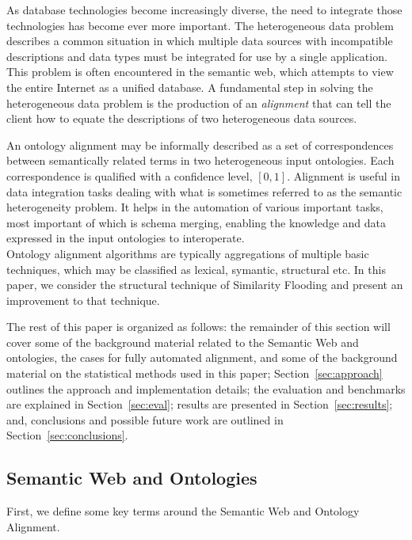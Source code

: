 \documentclass[letterpaper,twocolumn,12pt]{article}
\begin{document}
As database technologies become increasingly diverse, the need to integrate those
technologies has become ever more important. The heterogeneous data problem
describes a common situation in which multiple data sources
with incompatible descriptions and data types must be integrated
for use by a single application. This problem is often encountered in 
the semantic web, which attempts to view the entire Internet as a unified database. 
A fundamental step in solving the heterogeneous data problem
is the production of an \textit{alignment} that can tell the client how to equate
the descriptions of two heterogeneous data sources.

An ontology alignment may be informally described as a set of correspondences 
between semantically related terms in two heterogeneous input ontologies. 
Each correspondence is qualified with a confidence level, $[0,1]$.
Alignment is useful in data integration tasks dealing with what is sometimes 
referred to as the semantic heterogeneity problem. 
It helps in the automation of various important tasks, most important of which 
is schema merging, enabling the knowledge and data expressed in the input 
ontologies to interoperate. \\

Ontology alignment algorithms are typically aggregations of multiple
basic techniques, which may be classified as lexical, symantic, structural etc. \cite{euzenat:2007:ontology}
In this paper, we consider the structural technique of
Similarity Flooding and present an improvement to that technique.

\noindent The rest of this paper is organized as follows: 
the remainder of this section will cover some of the background material related 
to the Semantic Web and ontologies, the cases for fully automated alignment, 
and some of the background material on the statistical methods used in this paper; 
Section~\ref{sec:approach} outlines the approach and implementation details; 
the evaluation and benchmarks are explained in Section~\ref{sec:eval}; 
results are presented in Section~\ref{sec:results}; and, 
conclusions and possible future work are outlined in Section~\ref{sec:conclusions}.

\subsection{Semantic Web and Ontologies}
\label{subsec:semanticweb}
First, we define some key terms around the Semantic Web and Ontology Alignment.
\end{document}
